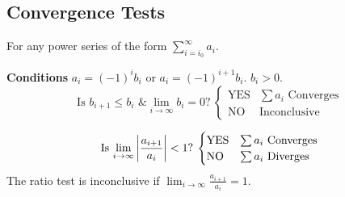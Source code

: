 \documentclass{article}
\begin{document}
\subsection{Convergence Tests}
For any power series of the form $\displaystyle\sum_{i=i_0}^\infty a_i$.
\begin{mdframed}[style=exampledefaultcols,frametitle={Alternating Series}]
    \textbf{Conditions} $a_i = \left( -1 \right)^i b_i$ or
    $a_i = \left( -1 \right)^{i+1} b_i$. $b_i>0$.
    \begin{equation*}
        \text{Is $b_{i+1}\leqslant b_i$ \& $\lim_{i\to\infty}b_i=0$?}\:
        \begin{cases}
            \text{YES} & \text{$\sum a_i$ Converges} \\
            \text{NO} & \text{Inconclusive}
        \end{cases}
    \end{equation*}
\end{mdframed}
\begin{mdframed}[style=exampledefaultcols,frametitle={Ratio Test}]
    \begin{equation*}
        \text{Is $\lim_{i\to\infty}\abs{\frac{a_{i+1}}{a_i}} < 1$?}\:
        \begin{cases}
            \text{YES} & \text{$\sum a_i$ Converges} \\
            \text{NO} & \text{$\sum a_i$ Diverges}
        \end{cases}
    \end{equation*}
    The ratio test is inconclusive if
    $\displaystyle \lim_{i\to\infty}\frac{a_{i+1}}{a_i} = 1$.
\end{mdframed}
\end{document}
